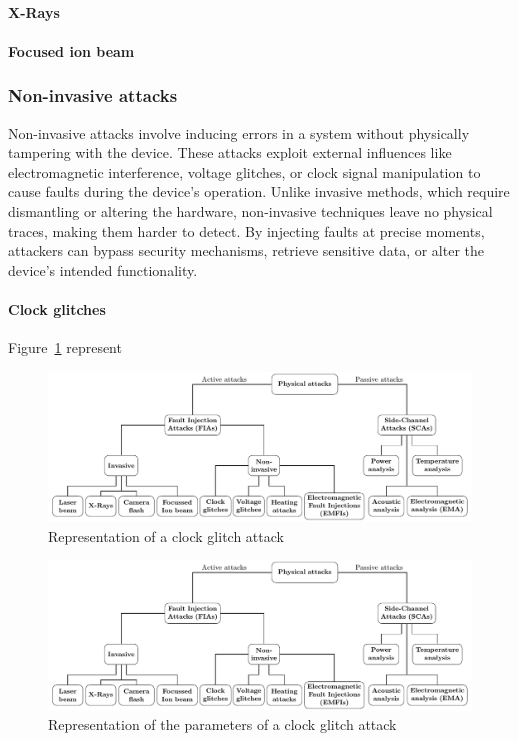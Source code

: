 \paragraph{X-Rays} \cite{ABCMRT-17-ches, TMZHM-23-iolts, GBD-23-paine}

\paragraph{Focused ion beam}

\subsubsection{Non-invasive attacks}
Non-invasive attacks involve inducing errors in a system without physically tampering with the device. These attacks exploit external influences like electromagnetic interference, voltage glitches, or clock signal manipulation to cause faults during the device's operation. Unlike invasive methods, which require dismantling or altering the hardware, non-invasive techniques leave no physical traces, making them harder to detect. By injecting faults at precise moments, attackers can bypass security mechanisms, retrieve sensitive data, or alter the device's intended functionality.

\paragraph{Clock glitches} 

Figure~\ref{fig:clock_glitch} represent

\begin{figure}[ht]
    \centering
    \includegraphics[page=4]{c2_soa/img/physicalAttacks.pdf}
    \caption{Representation of a clock glitch attack}
    \label{fig:clock_glitch}
\end{figure}


\begin{figure}[ht]
    \centering
    \includegraphics[page=5]{c2_soa/img/physicalAttacks.pdf}
    \caption{Representation of the parameters of a clock glitch attack}
    \label{fig:clock_glitch_parameters}
\end{figure}

